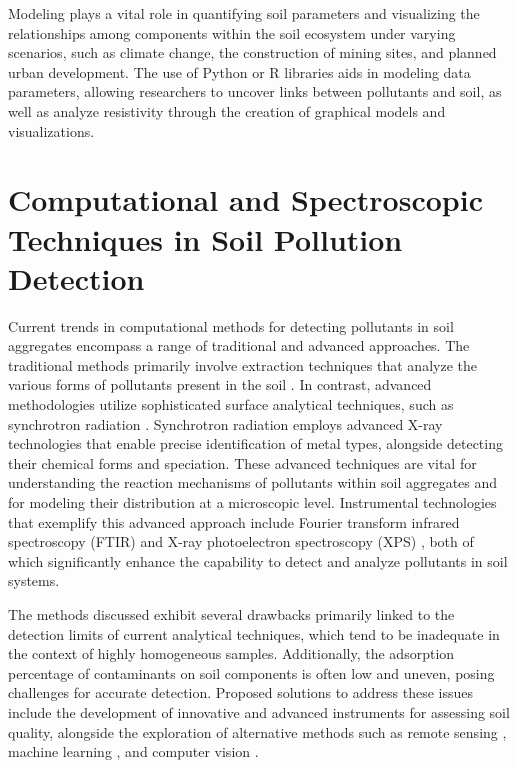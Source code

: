 \documentclass[sn-mathphys-num]{sn-jnl}
\begin{document}
Modeling plays a vital role in quantifying soil parameters and visualizing the
relationships among components within the soil ecosystem under varying
scenarios, such as climate change, the construction of mining sites, and
planned urban development. The use of Python or R libraries aids in modeling
data parameters, allowing researchers to uncover links between pollutants and
soil, as well as analyze resistivity through the creation of graphical models
and visualizations.

\section{Computational and Spectroscopic Techniques in Soil Pollution Detection}\label{sec3}

Current trends in computational methods for detecting pollutants in soil
aggregates encompass a range of traditional and advanced approaches. The
traditional methods primarily involve extraction techniques that analyze the
various forms of pollutants present in the soil \cite{Sutherland2010}. In
contrast, advanced methodologies utilize sophisticated surface analytical
techniques, such as synchrotron radiation
\cite{Hu2020,Rosskopfova2012,LindhLemenkova2023a}. Synchrotron radiation
employs advanced X-ray technologies that enable precise identification of
metal types, alongside detecting their chemical forms and speciation. These
advanced techniques are vital for understanding the reaction mechanisms of
pollutants within soil aggregates and for modeling their distribution at a
microscopic level. Instrumental technologies that exemplify this advanced
approach include Fourier transform infrared spectroscopy (FTIR) \cite{Xu2026}
and X-ray photoelectron spectroscopy (XPS)
\cite{Guo2025,LindhLemenkova2023c}, both of which significantly enhance the
capability to detect and analyze pollutants in soil systems.

The methods discussed exhibit several drawbacks primarily linked to the
detection limits of current analytical techniques, which tend to be inadequate
in the context of highly homogeneous samples. Additionally, the adsorption
percentage of contaminants on soil components is often low and uneven, posing
challenges for accurate detection. Proposed solutions to address these issues
include the development of innovative and advanced instruments for assessing
soil quality, alongside the exploration of alternative methods such as remote
sensing \cite{Fan2025,Lemenkova2025b}, machine learning
\cite{Proshad2025,Lemenkova2025d,Lemenkova2024b}, and computer vision
\cite{Feng2024}.
\end{document}
